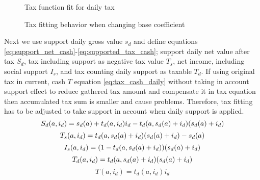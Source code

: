 \begin{figure} %
 \begin{center}
  \caption{Tax function fit for daily tax}
  \label{fig:DailyTax}
 \end{center}
\end{figure}
\begin{figure} %
 \begin{center}
  \caption{Tax fitting behavior when changing base coefficient}
  \label{fig:BaseTax}
 \end{center}
\end{figure}

Next we use support daily gross value $s_d$ and define equations \ref{eq:support_net_cash}-\ref{eq:supported_tax_cash};
support daily net value after tax $S_d$, tax including support as negative tax value $T_s$, net income,
including social support $I_s$, and tax counting daily support as taxable $T_d$.
If using original tax in current, cash $T$ equation \ref{eq:tax_cash_daily}
without taking in account support effect to reduce gathered tax amount and compensate it in tax equation
then accumulated tax sum is smaller and cause problems.
Therefore, tax fitting has to be adjusted to take support in account when daily support is applied.
\begin{equation} \label{eq:support_net_cash} \index{support daily}
S_d(a,i_d) = s_d(a) + t_d(a,i_d)i_d - t_d(a,s_d(a)+i_d)(s_d(a)+i_d)
\end{equation}
\begin{equation} \label{eq:supported_tax_cash} \index{tax negative}
T_s(a,i_d)=t_d(a,s_d(a)+i_d)(s_d(a)+i_d)-s_d(a)
\end{equation}
\begin{equation} \label{eq:supported_cash_net} \index{income supported}
I_s(a,i_d)=(1-t_d(a,s_d(a)+i_d))(s_d(a)+i_d)
\end{equation}
\begin{equation} \label{eq:supported_tax_cash_daily} \index{tax daily}
T_d(a,i_d)=t_d(a,s_d(a)+i_d)(s_d(a)+i_d)
\end{equation}
\begin{equation} \label{eq:tax_cash_daily}
T(a,i_d)=t_d(a,i_d)i_d
\end{equation}

